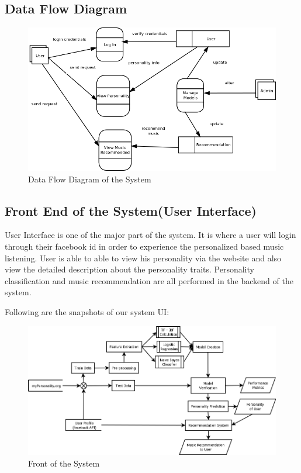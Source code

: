 \subsection{Data Flow Diagram}
\begin{figure}[!ht]
\centering
\includegraphics[width = 16 cm]{fig/dfd.png}
\caption{Data Flow Diagram of the System}
\label{fig:dfd}
\end{figure}

\newpage
\subsection{Front End of the System(User Interface)}
User Interface is one of the major part of the system. It is where a user will login through their facebook id in order to experience the personalized based music listening. User is able to able to view his personality via the website and also view the detailed description about the personality traits. Personality classification and music recommendation are all performed in the backend of the system. 

Following are the snapshots of our system UI:
\begin{figure}[!ht]
\centering
\includegraphics[width = 16 cm]{fig/System.png}
\caption{Front of the System}
\label{fig:front}
\end{figure}

